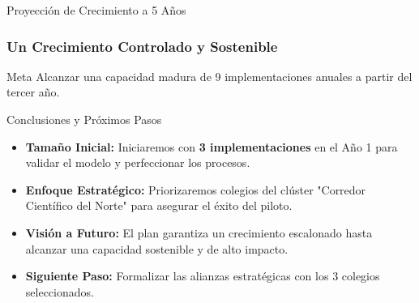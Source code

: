 \begin{frame}{Proyección de Crecimiento a 5 Años}
  \frametitle{Un Crecimiento Controlado y Sostenible}

  \begin{table}
    \centering
    \caption{Proyección de crecimiento hasta alcanzar la capacidad madura del proyecto.}
  \end{table}

  \vfill
  \begin{alertblock}{Meta}
    Alcanzar una capacidad madura de 9 implementaciones anuales a partir del tercer año.
  \end{alertblock}
\end{frame}

\begin{frame}{Conclusiones y Próximos Pasos}
  \begin{itemize}
    \item \textbf{Tamaño Inicial:} Iniciaremos con \textbf{3 implementaciones} en el Año 1 para validar el modelo y perfeccionar los procesos.
    \item \textbf{Enfoque Estratégico:} Priorizaremos colegios del clúster "Corredor Científico del Norte" para asegurar el éxito del piloto.
    \item \textbf{Visión a Futuro:} El plan garantiza un crecimiento escalonado hasta alcanzar una capacidad sostenible y de alto impacto.
    \item \textbf{Siguiente Paso:} Formalizar las alianzas estratégicas con los 3 colegios seleccionados.
  \end{itemize}
\end{frame}

